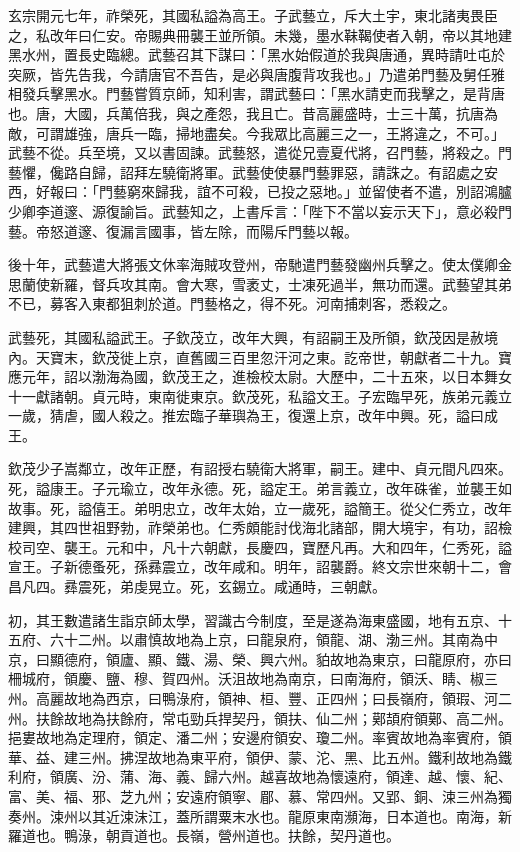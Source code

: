 \begin{pinyinscope}
 玄宗開元七年，祚榮死，其國私謚為高王。子武藝立，斥大土宇，東北諸夷畏臣之，私改年曰仁安。帝賜典冊襲王並所領。未幾，墨水靺鞨使者入朝，帝以其地建黑水州，置長史臨總。武藝召其下謀曰：「黑水始假道於我與唐通，異時請吐屯於突厥，皆先告我，今請唐官不吾告，是必與唐腹背攻我也。」乃遣弟門藝及舅任雅相發兵擊黑水。門藝嘗質京師，知利害，謂武藝曰：「黑水請吏而我擊之，是背唐也。唐，大國，兵萬倍我，與之產怨，我且亡。昔高麗盛時，士三十萬，抗唐為敵，可謂雄強，唐兵一臨，掃地盡矣。今我眾比高麗三之一，王將違之，不可。」武藝不從。兵至境，又以書固諫。武藝怒，遣從兄壹夏代將，召門藝，將殺之。門藝懼，儳路自歸，詔拜左驍衛將軍。武藝使使暴門藝罪惡，請誅之。有詔處之安西，好報曰：「門藝窮來歸我，誼不可殺，已投之惡地。」並留使者不遣，別詔鴻臚少卿李道邃、源復諭旨。武藝知之，上書斥言：「陛下不當以妄示天下」，意必殺門藝。帝怒道邃、復漏言國事，皆左除，而陽斥門藝以報。



 後十年，武藝遣大將張文休率海賊攻登州，帝馳遣門藝發幽州兵擊之。使太僕卿金思蘭使新羅，督兵攻其南。會大寒，雪袤丈，士凍死過半，無功而還。武藝望其弟不已，募客入東都狙刺於道。門藝格之，得不死。河南捕刺客，悉殺之。



 武藝死，其國私謚武王。子欽茂立，改年大興，有詔嗣王及所領，欽茂因是赦境內。天寶末，欽茂徙上京，直舊國三百里忽汗河之東。訖帝世，朝獻者二十九。寶應元年，詔以渤海為國，欽茂王之，進檢校太尉。大歷中，二十五來，以日本舞女十一獻諸朝。貞元時，東南徙東京。欽茂死，私謚文王。子宏臨早死，族弟元義立一歲，猜虐，國人殺之。推宏臨子華璵為王，復還上京，改年中興。死，謚曰成王。



 欽茂少子嵩鄰立，改年正歷，有詔授右驍衛大將軍，嗣王。建中、貞元間凡四來。死，謚康王。子元瑜立，改年永德。死，謚定王。弟言義立，改年硃雀，並襲王如故事。死，謚僖王。弟明忠立，改年太始，立一歲死，謚簡王。從父仁秀立，改年建興，其四世祖野勃，祚榮弟也。仁秀頗能討伐海北諸部，開大境宇，有功，詔檢校司空、襲王。元和中，凡十六朝獻，長慶四，寶歷凡再。大和四年，仁秀死，謚宣王。子新德蚤死，孫彞震立，改年咸和。明年，詔襲爵。終文宗世來朝十二，會昌凡四。彞震死，弟虔晃立。死，玄錫立。咸通時，三朝獻。



 初，其王數遣諸生詣京師太學，習識古今制度，至是遂為海東盛國，地有五京、十五府、六十二州。以肅慎故地為上京，曰龍泉府，領龍、湖、渤三州。其南為中京，曰顯德府，領廬、顯、鐵、湯、榮、興六州。貃故地為東京，曰龍原府，亦曰柵城府，領慶、鹽、穆、賀四州。沃沮故地為南京，曰南海府，領沃、睛、椒三州。高麗故地為西京，曰鴨淥府，領神、桓、豐、正四州；曰長嶺府，領瑕、河二州。扶餘故地為扶餘府，常屯勁兵捍契丹，領扶、仙二州；鄚頡府領鄚、高二州。挹婁故地為定理府，領定、潘二州；安邊府領安、瓊二州。率賓故地為率賓府，領華、益、建三州。拂涅故地為東平府，領伊、蒙、沱、黑、比五州。鐵利故地為鐵利府，領廣、汾、蒲、海、義、歸六州。越喜故地為懷遠府，領達、越、懷、紀、富、美、福、邪、芝九州；安遠府領寧、郿、慕、常四州。又郢、銅、涑三州為獨奏州。涑州以其近涑沫江，蓋所謂粟末水也。龍原東南瀕海，日本道也。南海，新羅道也。鴨淥，朝貢道也。長嶺，營州道也。扶餘，契丹道也。




\end{pinyinscope}
